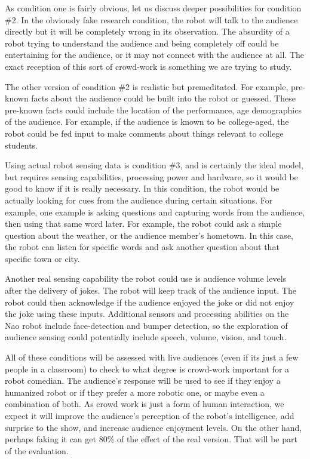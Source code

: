 \documentclass[onecolumn, draftclsnofoot,10pt, compsoc]{IEEEtran}
\begin{document}
As condition one is fairly obvious, let us discuss deeper possibilities for condition \#2. In the obviously fake research condition, the robot will talk to the audience directly but it will be completely wrong in its observation. The absurdity of a robot trying to understand the audience and being completely off could be entertaining for the audience, or it may not connect with the audience at all. The exact reception of this sort of crowd-work is something we are trying to study.

The other version of condition \#2 is realistic but premeditated. For example, pre-known facts about the audience could be built into the robot or guessed. These pre-known facts could include the location of the performance, age demographics of the audience. For example, if the audience is known to be college-aged, the robot could be fed input to make comments about things relevant to college students.

Using actual robot sensing data is condition \#3, and is certainly the ideal model, but requires sensing capabilities, processing power and hardware, so it would be good to know if it is really necessary. In this condition, the robot would be actually looking for cues from the audience during certain situations. For example, one example is asking questions and capturing words from the audience, then using that same word later. For example, the robot could ask a simple question about the weather, or the audience member's hometown. In this case, the robot can listen for specific words and ask another question about that specific town or city.

Another real sensing capability the robot could use is  audience volume levels after the delivery of jokes. The robot will keep track of the audience input. The robot could then acknowledge if the audience enjoyed the joke or did not enjoy the joke using these inputs. Additional sensors and processing abilities on the Nao robot include face-detection and bumper detection, so the exploration of audience sensing could potentially include speech, volume, vision, and touch.

All of these conditions will be assessed with live audiences (even if its just a few people in a classroom) to check to what degree is crowd-work important for a robot comedian. The audience's response will be used to see if they enjoy a humanized robot or if they prefer a more robotic one, or maybe even a combination of both. As crowd work is just a form of human interaction, we expect it will improve the audience's perception of the robot's intelligence, add surprise to the show, and increase audience enjoyment levels. On the other hand, perhaps faking it can get 80\% of the effect of the real version. That will be part of the evaluation.
\end{document}
